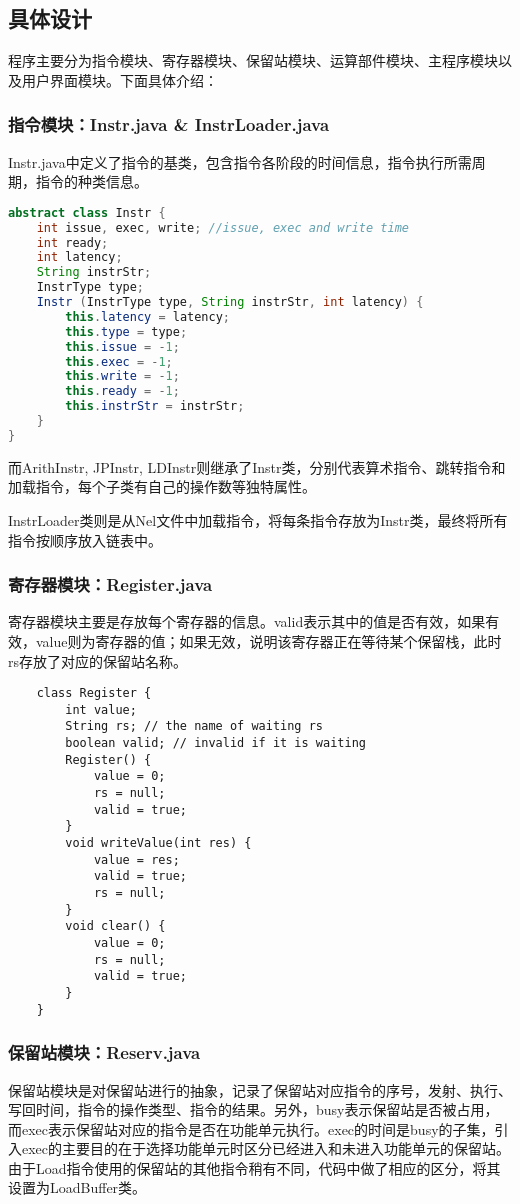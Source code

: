 \documentclass[paper=a4, fontsize=11pt, UTF8]{article} %
\begin{document}
\subsection{具体设计}
程序主要分为指令模块、寄存器模块、保留站模块、运算部件模块、主程序模块以及用户界面模块。下面具体介绍：
\subsubsection{指令模块：Instr.java \& InstrLoader.java}
Instr.java中定义了指令的基类，包含指令各阶段的时间信息，指令执行所需周期，指令的种类信息。
\begin{lstlisting}[language=java]
    abstract class Instr {
    int issue, exec, write; //issue, exec and write time
    int ready;
    int latency;
    String instrStr;
    InstrType type;
    Instr (InstrType type, String instrStr, int latency) {
        this.latency = latency;
        this.type = type;
        this.issue = -1;
        this.exec = -1;
        this.write = -1;
        this.ready = -1;
        this.instrStr = instrStr;
    }
}
\end{lstlisting}
而ArithInstr, JPInstr, LDInstr则继承了Instr类，分别代表算术指令、跳转指令和加载指令，每个子类有自己的操作数等独特属性。

InstrLoader类则是从Nel文件中加载指令，将每条指令存放为Instr类，最终将所有指令按顺序放入链表中。

\subsubsection{寄存器模块：Register.java}
寄存器模块主要是存放每个寄存器的信息。valid表示其中的值是否有效，如果有效，value则为寄存器的值；如果无效，说明该寄存器正在等待某个保留栈，此时rs存放了对应的保留站名称。
\begin{lstlisting}
    class Register {
        int value;
        String rs; // the name of waiting rs
        boolean valid; // invalid if it is waiting
        Register() {
            value = 0;
            rs = null;
            valid = true;
        }
        void writeValue(int res) {
            value = res;
            valid = true;
            rs = null;
        }
        void clear() {
            value = 0;
            rs = null;
            valid = true;
        }
    }
\end{lstlisting}

\subsubsection{保留站模块：Reserv.java}
保留站模块是对保留站进行的抽象，记录了保留站对应指令的序号，发射、执行、写回时间，指令的操作类型、指令的结果。另外，busy表示保留站是否被占用，而exec表示保留站对应的指令是否在功能单元执行。exec的时间是busy的子集，引入exec的主要目的在于选择功能单元时区分已经进入和未进入功能单元的保留站。由于Load指令使用的保留站的其他指令稍有不同，代码中做了相应的区分，将其设置为LoadBuffer类。
\end{document}
